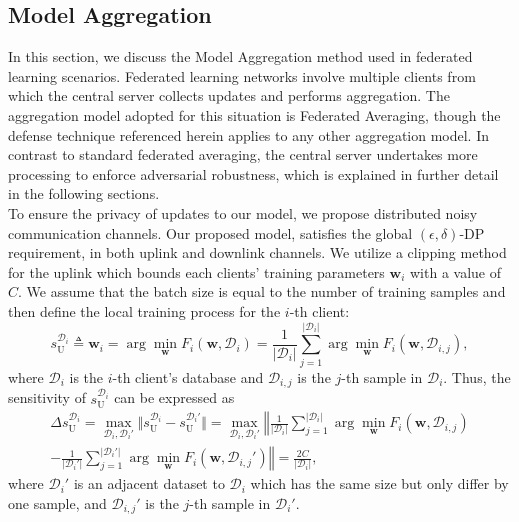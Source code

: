  \subsection{Model Aggregation}
 In this section, we discuss the Model Aggregation method used in federated learning scenarios. Federated learning networks involve multiple clients from which the central server collects updates and performs aggregation. The aggregation model adopted for this situation is Federated Averaging, though the defense technique referenced herein applies to any other aggregation model. In contrast to standard federated averaging, the central server undertakes more processing to  enforce adversarial robustness, which is explained in further detail in the following sections.\\ To ensure the privacy of updates to our model, we propose distributed noisy communication channels. Our proposed model, satisfies the global $(\epsilon, \delta)$-DP requirement, in both uplink and downlink channels. 
We utilize a clipping method for the uplink which bounds each clients' training parameters $\mathbf{w}_{i}$ with a value of $C$. We assume that the batch size is equal to the number of training samples and then define the local training process for the $i$-th client:
\begin{equation}
\label{localtrain}
{s}_{\text{U}}^{\mathcal D_i}\triangleq \mathbf{w}_{i}=\arg\min\limits_{\mathbf{w}}{F_{i}(\mathbf{w}, \mathcal D_i)}=\frac{1}{\vert \mathcal D_i \vert}\sum_{j = 1}^{\vert \mathcal D_i \vert}\arg\min\limits_{\mathbf{w}}{F_{i}(\mathbf{w}, \mathcal D_{i,j})},
\end{equation}
where $\mathcal D_i$ is the $i$-th client's database and $\mathcal D_{i,j}$ is the $j$-th sample in $\mathcal D_i$. Thus, the sensitivity of $s_{\text{U}}^{\mathcal D_i}$ can be expressed as
\begin{multline}\label{SensitivityforUP}
\Delta s_{\text{U}}^{\mathcal D_i} =\max_{\mathcal D_i, \mathcal D_i'}{\Vert s_{\text{U}}^{\mathcal D_i}-s_{\text{U}}^{ \mathcal D_i'}\Vert}
=\max_{\mathcal D_i, \mathcal D_i'}\left\Vert \frac{1}{\vert \mathcal D_i \vert}\sum_{j = 1}^{\vert \mathcal D_i \vert}\arg\min\limits_{\mathbf{w}}{F_{i}(\mathbf{w}, \mathcal D_{i,j})}\right.\\
\left.-\frac{1}{\vert \mathcal D_i' \vert}\sum_{j = 1}^{\vert \mathcal D_i' \vert}\arg\min\limits_{\mathbf{w}}{F_{i}(\mathbf{w}, \mathcal D_{i,j}')}\right\Vert= \frac{2C}{\vert \mathcal D_i \vert},
\end{multline}
where $\mathcal D_i'$ is an adjacent dataset to $\mathcal D_i$ which has the same size but only differ by one sample, and $\mathcal D_{i,j}'$ is the $j$-th sample in $\mathcal D_i'$.

